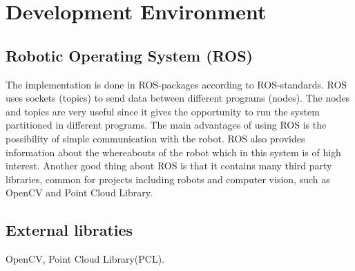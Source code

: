 
\section{Development Environment}

\subsection{Robotic Operating System (ROS)}
The implementation is done in ROS-packages according to ROS-standards. ROS uses sockets (topics) to send data between different programs (nodes). The nodes and topics are very useful since it gives the opportunity to run the system partitioned in different programs. The main advantages of using ROS is the possibility of simple communication with the robot. ROS also provides information about the whereabouts of the robot which in this system is of high interest. Another good thing about ROS is that it contains many third party libraries, common for projects including robots and computer vision, such as OpenCV and Point Cloud Library.  

\subsection{External libraties}
OpenCV, Point Cloud Library(PCL).